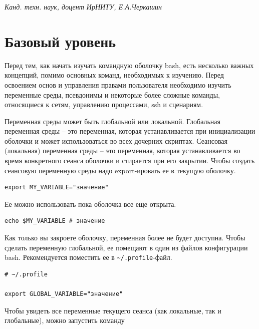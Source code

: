 \documentclass[12pt]{article}
\begin{document}
\vspace{3em}
\begin{flushright}\it
  Канд. техн. наук, доцент ИрНИТУ, Е.А.Черкашин
\end{flushright}

\clearpage

\hypertarget{Environment-variables}{%
\section{\texorpdfstring{\protect\hyperlink{Environment-variables}{}Базовый уровень}{Базовый уровень}}\label{Environment-variables}}

Перед тем, как начать изучать командную оболочку bash, есть несколько
важных концепций, помимо основных команд, необходимых к изучению. Перед
освоением основ и управления правами пользователя необходимо
изучить переменные среды, псевдонимы и некоторые более сложные команды,
относящиеся к сетям, управлению процессами, ssh и сценариям.

Переменная среды может быть глобальной или локальной. Глобальная
переменная среды -- это переменная, которая устанавливается при
инициализации оболочки и может использоваться во всех дочерних скриптах.
Сеансовая (локальная) переменная среды -- это переменная, которая
устанавливается во время конкретного сеанса оболочки и стирается при его
закрытии. Чтобы создать сеансовую переменную среды надо export-ировать
ее в текущую оболочку.

\begin{verbatim}
export MY_VARIABLE="значение"
\end{verbatim}

Ее можно использовать пока оболочка все еще открыта.

\begin{verbatim}
echo $MY_VARIABLE # значение
\end{verbatim}

Как только вы закроете оболочку, переменная более не будет доступна.
Чтобы сделать переменную глобальной, ее помещают в один из файлов
конфигурации bash. Рекомендуется поместить ее в
\texttt{\textasciitilde{}/.profile}-файл.

\begin{verbatim}
# ~/.profile

export GLOBAL_VARIABLE="значение"
\end{verbatim}

Чтобы увидеть все переменные текущего сеанса (как локальные, так и
глобальные), можно запустить команду
\end{document}
